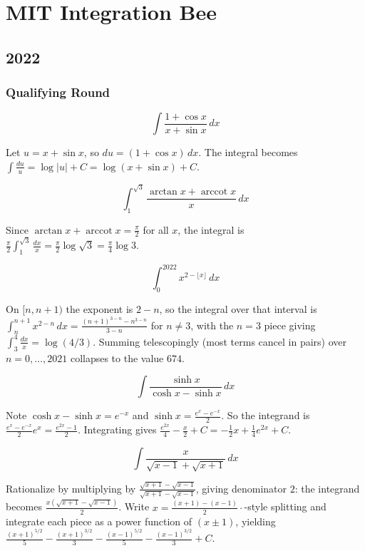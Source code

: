 \pagebreak
\section{MIT Integration Bee}

\subsection*{2022}
\subsubsection*{Qualifying Round}

\begin{questions}

\question
\[\int \frac{1+\cos x}{x+\sin x}\,dx\]
\begin{solution}
Let $u = x+\sin x$, so $du = (1+\cos x)\,dx$. The integral becomes $\int \frac{du}{u} = \log|u| + C = \log(x+\sin x)+C$.
\end{solution}

\question
\[\int_1^{\sqrt3} \frac{\arctan x+\operatorname{arccot}x}{x}\,dx\]
\begin{solution}
Since $\arctan x+\operatorname{arccot}x = \frac{\pi}{2}$ for all $x$, the integral is $\frac{\pi}{2}\int_1^{\sqrt3}\frac{dx}{x} = \frac{\pi}{2}\log\sqrt3 = \frac{\pi}{4}\log 3$.
\end{solution}

\question
\[\int_0^{2022} x^{2-\lfloor x\rfloor}\,dx\]
\begin{solution}
On $[n,n+1)$ the exponent is $2-n$, so the integral over that interval is $\int_n^{n+1}x^{2-n}\,dx = \frac{(n+1)^{3-n}-n^{3-n}}{3-n}$ for $n\neq3$, with the $n=3$ piece giving $\int_3^4\frac{dx}{x}=\log(4/3)$. Summing telescopingly (most terms cancel in pairs) over $n=0,\dots,2021$ collapses to the value $674$.
\end{solution}

\question
\[\int \frac{\sinh x}{\cosh x - \sinh x}\,dx\]
\begin{solution}
Note $\cosh x - \sinh x = e^{-x}$ and $\sinh x = \frac{e^x-e^{-x}}{2}$. So the integrand is $\frac{e^x-e^{-x}}{2}e^{x} = \frac{e^{2x}-1}{2}$. Integrating gives $\frac{e^{2x}}{4}-\frac{x}{2}+C = -\frac12 x+\frac14 e^{2x}+C$.
\end{solution}

\question
\[\int \frac{x}{\sqrt{x-1}+\sqrt{x+1}}\,dx\]
\begin{solution}
Rationalize by multiplying by $\frac{\sqrt{x+1}-\sqrt{x-1}}{\sqrt{x+1}-\sqrt{x-1}}$, giving denominator $2$: the integrand becomes $\frac{x(\sqrt{x+1}-\sqrt{x-1})}{2}$. Write $x = \frac{(x+1)-(x-1)}{2}\cdot$-style splitting and integrate each piece as a power function of $(x\pm1)$, yielding
$\frac{(x+1)^{5/2}}{5}-\frac{(x+1)^{3/2}}{3}-\frac{(x-1)^{5/2}}{5}-\frac{(x-1)^{3/2}}{3}+C$.
\end{solution}


\end{questions}
